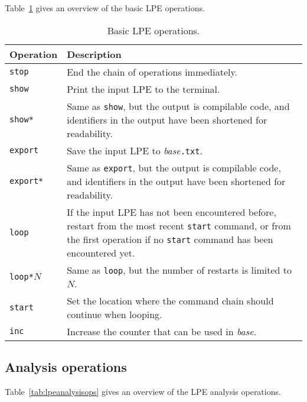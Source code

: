 Table~\ref{tab:basiclpeops} gives an overview of the basic LPE operations.

\begin{table}[!ht]
\begin{center}
\begin{tabularx}{\linewidth}{l|X|}
\textbf{Operation} & \textbf{Description} \\ \hline
\texttt{stop} & End the chain of operations immediately. \\ \hline
\texttt{show} & Print the input LPE to the terminal. \\ \hline
\texttt{show*} & Same as \texttt{show}, but the output is compilable \txs{} code, and identifiers in the output have been shortened for readability. \\ \hline
\texttt{export} & Save the input LPE to \textit{base}\texttt{.txt}. \\ \hline
\texttt{export*} & Same as \texttt{export}, but the output is compilable \txs{} code, and identifiers in the output have been shortened for readability. \\ \hline
\texttt{loop} & If the input LPE has not been encountered before, restart from the most recent \texttt{start} command, or from the first operation if no \texttt{start} command has been encountered yet. \\ \hline
\texttt{loop*}$N$ & Same as \texttt{loop}, but the number of restarts is limited to $N$. \\ \hline
\texttt{start} & Set the location where the command chain should continue when looping. \\ \hline
\texttt{inc} & Increase the counter that can be used in \textit{base}. \\ \hline
\end{tabularx}
\caption{Basic LPE operations.}
\label{tab:basiclpeops}
\end{center}
\end{table}

\subsection{Analysis operations}

Table~\ref{tab:lpeanalysisops} gives an overview of the LPE analysis operations.

